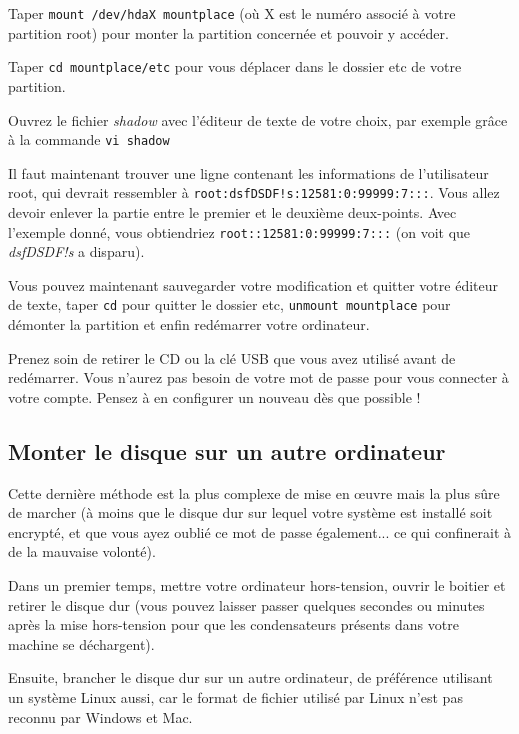 Taper \verb|mount /dev/hdaX mountplace| (où X est le numéro associé à votre partition root) pour monter la partition concernée et pouvoir y accéder.

Taper \verb|cd mountplace/etc| pour vous déplacer dans le dossier etc de votre partition. 

Ouvrez le fichier \emph{shadow} avec l'éditeur de texte de votre choix, par exemple grâce à la commande \verb|vi shadow|

Il faut maintenant trouver une ligne contenant les informations de l'utilisateur root, qui devrait ressembler à \verb|root:dsfDSDF!s:12581:0:99999:7:::|. Vous allez devoir enlever la partie entre le premier et le deuxième deux-points. Avec l'exemple donné, vous obtiendriez \verb|root::12581:0:99999:7:::| (on voit que \emph{dsfDSDF!s} a disparu).

Vous pouvez maintenant sauvegarder votre modification et quitter votre éditeur de texte, taper \verb|cd| pour quitter le dossier etc, \verb|unmount mountplace| pour démonter la partition et enfin redémarrer votre ordinateur.

Prenez soin de retirer le CD ou la clé USB que vous avez utilisé avant de redémarrer. Vous n'aurez pas besoin de votre mot de passe pour vous connecter à votre compte. Pensez à en configurer un nouveau dès que possible ! 

\subsection{Monter le disque sur un autre ordinateur}
Cette dernière méthode est la plus complexe de mise en \oe{}uvre mais la plus sûre de marcher (à moins que le disque dur sur lequel votre système est installé soit encrypté, et que vous ayez oublié ce mot de passe également... ce qui confinerait à de la mauvaise volonté). 

Dans un premier temps, mettre votre ordinateur hors-tension, ouvrir le boitier et retirer le disque dur (vous pouvez laisser passer quelques secondes ou minutes après la mise hors-tension pour que les condensateurs présents dans votre machine se déchargent). 

Ensuite, brancher le disque dur sur un autre ordinateur, de préférence utilisant un système Linux aussi, car le format de fichier utilisé par Linux n'est pas reconnu par Windows et Mac. 

